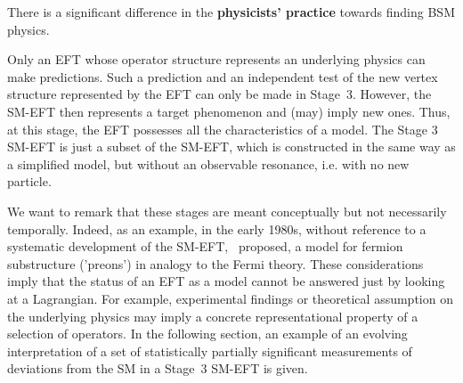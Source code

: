 There is a significant difference in the \textbf{physicists' practice} towards finding BSM physics.

Only an EFT whose operator structure represents an underlying physics can
make  predictions. 
Such a prediction and an independent
test of the new vertex structure represented by the  EFT can only be
made in Stage~3.  
However, the SM-EFT then
represents a target phenomenon and (may) imply new ones.  
Thus, at this stage, the EFT possesses all the characteristics of a model.
The Stage 3 SM-EFT is just a subset of the SM-EFT, which is constructed in the same way as a simplified model, but without an observable resonance, i.e. with no new particle.



We want to remark that these stages are meant conceptually but not necessarily temporally.
Indeed, as an example, in the early 1980s, without reference to
a systematic development of the SM-EFT,~\citep{Eichten:1983hw} proposed,
a model for fermion substructure ('preons') in analogy to the Fermi theory.
These considerations imply that the status of an EFT as
a model cannot be answered just by looking at a Lagrangian. 
For example, experimental findings or theoretical assumption on the underlying physics
may imply a concrete representational property of a selection of operators.
In the following section, an example of an evolving interpretation of a set of statistically partially significant measurements of deviations from the SM in a Stage~3 SM-EFT is given.

